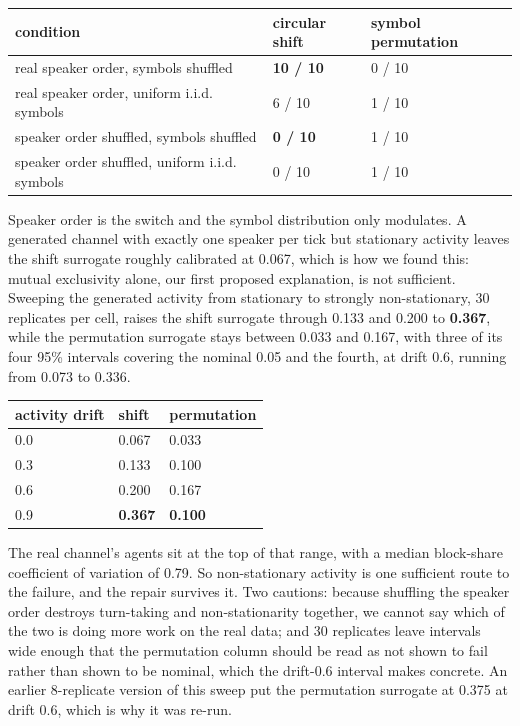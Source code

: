 \documentclass[11pt]{article}
\begin{document}
\begin{center}
\small
\begin{tabular}{lll}
\toprule
\textbf{condition} & \textbf{circular shift} & \textbf{symbol permutation} \\
\midrule
real speaker order, symbols shuffled & \textbf{10 / 10} & 0 / 10 \\
real speaker order, uniform i.i.d. symbols & 6 / 10 & 1 / 10 \\
speaker order shuffled, symbols shuffled & \textbf{0 / 10} & 1 / 10 \\
speaker order shuffled, uniform i.i.d. symbols & 0 / 10 & 1 / 10 \\
\bottomrule
\end{tabular}
\end{center}

Speaker order is the switch and the symbol distribution only modulates. A generated channel with exactly one speaker per tick but stationary activity leaves the shift surrogate roughly calibrated at 0.067, which is how we found this: mutual exclusivity alone, our first proposed explanation, is not sufficient. Sweeping the generated activity from stationary to strongly non-stationary, 30 replicates per cell, raises the shift surrogate through 0.133 and 0.200 to \textbf{0.367}, while the permutation surrogate stays between 0.033 and 0.167, with three of its four 95\% intervals covering the nominal 0.05 and the fourth, at drift 0.6, running from 0.073 to 0.336.

\begin{center}
\small
\begin{tabular}{lll}
\toprule
\textbf{activity drift} & \textbf{shift} & \textbf{permutation} \\
\midrule
0.0 & 0.067 & 0.033 \\
0.3 & 0.133 & 0.100 \\
0.6 & 0.200 & 0.167 \\
0.9 & \textbf{0.367} & \textbf{0.100} \\
\bottomrule
\end{tabular}
\end{center}

The real channel's agents sit at the top of that range, with a median block-share coefficient of variation of 0.79. So non-stationary activity is one sufficient route to the failure, and the repair survives it. Two cautions: because shuffling the speaker order destroys turn-taking and non-stationarity together, we cannot say which of the two is doing more work on the real data; and 30 replicates leave intervals wide enough that the permutation column should be read as not shown to fail rather than shown to be nominal, which the drift-0.6 interval makes concrete. An earlier 8-replicate version of this sweep put the permutation surrogate at 0.375 at drift 0.6, which is why it was re-run.
\end{document}
